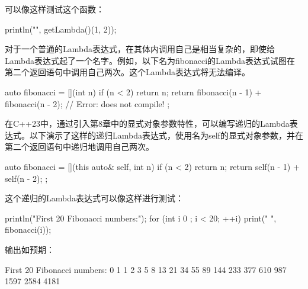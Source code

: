 可以像这样测试这个函数：

\begin{cpp}
println("{}", getLambda()(1, 2));
\end{cpp}



对于一个普通的Lambda表达式，在其体内调用自己是相当复杂的，即使给Lambda表达式起了一个名字。例如，以下名为fibonacci的Lambda表达式试图在第二个返回语句中调用自己两次。这个Lambda表达式将无法编译。

\begin{cpp}
auto fibonacci = [](int n) {
    if (n < 2) { return n; }
    return fibonacci(n - 1) + fibonacci(n - 2); // Error: does not compile!
};
\end{cpp}

在C++23中，通过引入第8章中的显式对象参数特性，可以编写递归的Lambda表达式。以下演示了这样的递归Lambda表达式，使用名为self的显式对象参数，并在第二个返回语句中递归地调用自己两次。

\begin{cpp}
auto fibonacci = [](this auto& self, int n) {
    if (n < 2) { return n; }
    return self(n - 1) + self(n - 2);
};
\end{cpp}

这个递归的Lambda表达式可以像这样进行测试：

\begin{cpp}
println("First 20 Fibonacci numbers:");
for (int i { 0 }; i < 20; ++i) { print("{} ", fibonacci(i)); }
\end{cpp}

输出如预期：

\begin{shell}
First 20 Fibonacci numbers:
0 1 1 2 3 5 8 13 21 34 55 89 144 233 377 610 987 1597 2584 4181
\end{shell}







